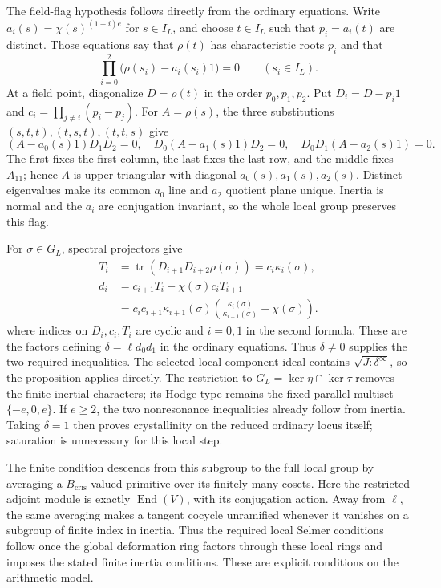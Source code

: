 The field-flag hypothesis follows directly from the ordinary equations.
Write $a_i(s)=\chi(s)^{(1-i)e}$ for $s\in I_L$, and choose
$t\in I_L$ such that $p_i=a_i(t)$ are distinct.  Those equations say
that $\rho(t)$ has characteristic roots $p_i$ and that
\[
  \prod_{i=0}^{2}\bigl(\rho(s_i)-a_i(s_i)1\bigr)=0
                   \qquad(s_i\in I_L).
\]
At a field point, diagonalize $D=\rho(t)$ in the order $p_0,p_1,p_2$.
Put $D_i=D-p_i1$ and $c_i=\prod_{j\ne i}(p_i-p_j)$.
For $A=\rho(s)$, the three substitutions $(s,t,t),(t,s,t),(t,t,s)$
give
\[
 (A-a_0(s)1)D_1D_2=0,\quad
 D_0(A-a_1(s)1)D_2=0,\quad
 D_0D_1(A-a_2(s)1)=0.
\]
The first fixes the first column, the last fixes the last row, and
the middle fixes $A_{11}$; hence $A$ is upper triangular with diagonal
$a_0(s),a_1(s),a_2(s)$.  Distinct eigenvalues make its common $a_0$
line and $a_2$ quotient plane unique.  Inertia is normal and the
$a_i$ are conjugation invariant, so the whole local group preserves
this flag.

For $\sigma\in G_L$, spectral projectors give
\[
 \begin{aligned}
 T_i&=\operatorname{tr}(D_{i+1}D_{i+2}\rho(\sigma))
       =c_i\kappa_i(\sigma),\\
 d_i&=c_{i+1}T_i-\chi(\sigma)c_iT_{i+1}\\
    &=c_ic_{i+1}\kappa_{i+1}(\sigma)
       \left(\frac{\kappa_i(\sigma)}{\kappa_{i+1}(\sigma)}
                         -\chi(\sigma)\right).
 \end{aligned}
\]
where indices on $D_i,c_i,T_i$ are cyclic and $i=0,1$ in the
second formula.  These are the factors defining
$\delta=\ell d_0d_1$ in the ordinary equations.
Thus $\delta\ne0$ supplies the two required inequalities.
The selected local component ideal contains
$\sqrt{J:\delta^\infty}$, so the proposition applies directly.
The restriction to $G_L=\ker\eta\cap\ker\tau$ removes the finite
inertial characters; its Hodge type remains the fixed parallel
multiset $\{-e,0,e\}$.
If $e\ge2$, the two nonresonance inequalities already follow from
inertia.  Taking $\delta=1$ then proves crystallinity on the reduced
ordinary locus itself; saturation is unnecessary for this local step.

The finite condition descends from this subgroup to the full local
group by averaging a $B_{\mathrm{cris}}$-valued primitive over its
finitely many cosets.  Here the restricted adjoint module is exactly
$\operatorname{End}(V)$, with its conjugation action.
Away from $\ell$, the same averaging makes
a tangent cocycle unramified whenever it vanishes on a subgroup of
finite index in inertia.  Thus the required local Selmer conditions
follow once the global deformation ring factors through these local
rings and imposes the stated finite inertia conditions.  These are
explicit conditions on the arithmetic model.
